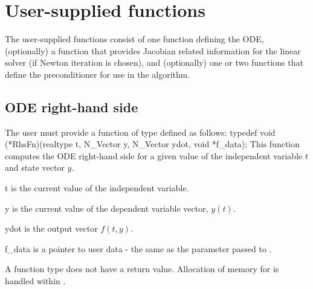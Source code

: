 \section{User-supplied functions}\label{ss:user_fct_sim}

The user-supplied functions consist of one function defining the ODE, 
(optionally) a function that provides Jacobian related information for the linear 
solver (if Newton iteration is chosen), and (optionally) one or two functions 
that define the preconditioner for use in the {\spgmr} algorithm. 
\subsection{ODE right-hand side} 
\label{ss:rhsFn}
The user must provide a function of type  defined as follows:
{
  typedef void (*RhsFn)(realtype t, N\_Vector y, N\_Vector ydot, void *f\_data);
}
{
  This function computes the ODE right-hand side for a given value
  of the independent variable $t$ and state vector $y$.
}
{
  \begin{args}[f\_data]
  \item[t]
    is the current value of the independent variable.
  \item[y]
    is the current value of the dependent variable vector, $y(t)$.
  \item[ydot]
    is the output vector $f(t,y)$.
  \item[f\_data]
    is a pointer to user data - the same as the       
    parameter passed to .   
  \end{args}
}
{
  A  function type does not have a return value.                        
}
{
Allocation of memory for  is handled within {\cvode}.
}
